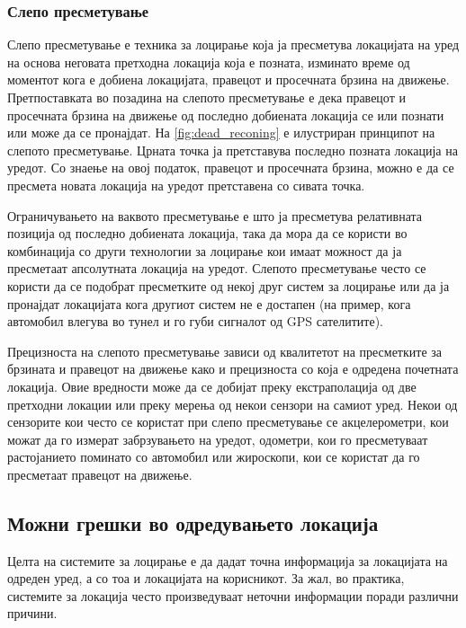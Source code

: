 \subsubsection{Слепо пресметување}

Слепо пресметување е техника за лоцирање која
ја пресметува локацијата на уред на основа неговата претходна локација која е позната,
изминато време од моментот кога е добиена локацијата, правецот и просечната
брзина на движење. Претпоставката  во позадина на слепото пресметување е дека
правецот и просечната брзина на движење од последно добиената локација се или
познати или може да се пронајдат. На \ref{fig:dead_reconing} е илустриран принципот на
слепото пресметување. Црната точка ја претставува последно позната локација на уредот.
Со знаење на овој податок, правецот и просечната брзина, можно е да се пресмета
новата локација на уредот претставена со сивата точка. 

Ограничувањето на ваквото
пресметување е што ја пресметува релативната позиција од последно добиената
локација, така да мора да се користи во комбинација со други технологии за
лоцирање кои имаат можност да ја пресметаат апсолутната локација на уредот.
Слепото пресметување често се користи да се подобрат пресметките од некој друг
систем за лоцирање или да ја пронајдат локацијата кога другиот систем не е
достапен (на пример, кога автомобил влегува во тунел и го губи сигналот од GPS
сателитите). 

Прецизноста на слепото пресметување зависи од квалитетот на
пресметките за брзината и правецот на движење како и прецизноста со која е
одредена почетната локација. Овие вредности може да се добијат преку
екстраполација од две претходни локации или преку мерења од некои сензори на
самиот уред. Некои од сензорите кои често се користат при слепо пресметување се
акцелерометри, кои можат да го измерат забрзувањето на уредот, одометри, кои го
пресметуваат растојанието поминато со автомобил или жироскопи, кои се користат
да го пресметаат правецот на движење. 

\subsection{Можни грешки во одредувањето локација}

Целта на системите за лоцирање е да дадат точна информација за локацијата на
одреден уред, а со тоа и локацијата на корисникот. За жал, во практика,
системите за локација често произведуваат неточни информации поради различни
причини.

